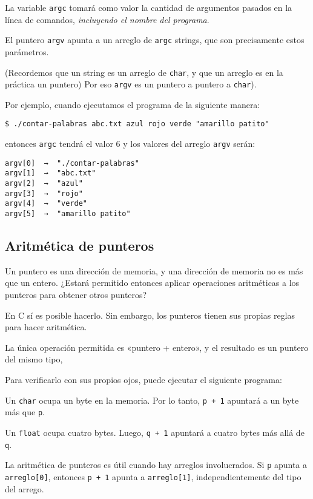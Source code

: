 La variable \lstinline!argc! tomará como valor la cantidad de argumentos
pasados en la línea de comandos, \emph{incluyendo el nombre del
programa}.

El puntero \lstinline!argv! apunta a un arreglo de \lstinline!argc!
strings, que son precisamente estos parámetros.

(Recordemos que un string es un arreglo de \lstinline!char!, y que un
arreglo es en la práctica un puntero) Por eso \lstinline!argv! es un
puntero a puntero a \lstinline!char!).

Por ejemplo, cuando ejecutamos el programa de la siguiente manera:

\begin{lstlisting}
$ ./contar-palabras abc.txt azul rojo verde "amarillo patito"
\end{lstlisting}

entonces \lstinline!argc! tendrá el valor 6 y los valores del arreglo
\lstinline!argv! serán:

\begin{lstlisting}
argv[0]  →  "./contar-palabras"
argv[1]  →  "abc.txt"
argv[2]  →  "azul"
argv[3]  →  "rojo"
argv[4]  →  "verde"
argv[5]  →  "amarillo patito"
\end{lstlisting}

\subsection{Aritmética de punteros}

Un puntero es una dirección de memoria, y una dirección de memoria no es
más que un entero. ¿Estará permitido entonces aplicar operaciones
aritméticas a los punteros para obtener otros punteros?

En C sí es posible hacerlo. Sin embargo, los punteros tienen sus propias
reglas para hacer aritmética.

La única operación permitida es «puntero + entero», y el resultado es un
puntero del mismo tipo,

Para verificarlo con sus propios ojos, puede ejecutar el siguiente
programa:

Un \lstinline!char! ocupa un byte en la memoria. Por lo tanto,
\lstinline!p + 1! apuntará a un byte más que \lstinline!p!.

Un \lstinline!float! ocupa cuatro bytes. Luego, \lstinline!q + 1!
apuntará a cuatro bytes más allá de \lstinline!q!.

La aritmética de punteros es útil cuando hay arreglos involucrados. Si
\lstinline!p! apunta a \lstinline!arreglo[0]!, entonces
\lstinline!p + 1! apunta a \lstinline!arreglo[1]!, independientemente
del tipo del arrego.


